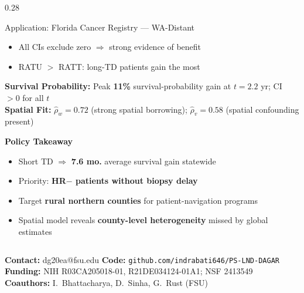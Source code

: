\documentclass[final]{beamer}
\begin{document}
\begin{frame}[fragile]
\begin{columns}[T]
\begin{column}{0.28\textwidth}
\begin{appblock}{Application: Florida Cancer Registry --- WA-Distant}
\raggedright
\vspace{3pt}
\begin{itemize}
\item All CIs exclude zero $\Rightarrow$ strong evidence of benefit
\item RATU $>$ RATT: long-TD patients gain the most
\end{itemize}

\vspace{3pt}
\begin{findingbox}
{\color{accentgreen!80!black}\textbf{Survival Probability:}} Peak \textbf{11\%} survival-probability gain at $t\!=\!2.2$ yr; CI $> 0$ for all $t$\\[2pt]
{\color{accentgreen!80!black}\textbf{Spatial Fit:}} $\hat{\rho}_w = 0.72$ (strong spatial borrowing); $\hat{\rho}_v = 0.58$ (spatial confounding present)
\end{findingbox}

\vspace{3pt}
\begin{keybox}
\centering
{\large\textbf{Policy Takeaway}}\\[2pt]
\begin{itemize}[itemsep=3pt]
\item Short TD $\Rightarrow$ \textbf{7.6 mo.} average survival gain statewide
\item Priority: \textbf{HR$-$ patients without biopsy delay}
\item Target \textbf{rural northern counties} for patient-navigation programs
\item Spatial model reveals \textbf{county-level heterogeneity} missed by global estimates
\end{itemize}
\end{keybox}

\end{appblock}

\end{column}

\end{columns}

\vspace{3pt}
\begin{tcolorbox}[
  colback=FSUgarnet, colframe=FSUgarnet, arc=0mm, boxrule=0pt,
  left=30pt, right=30pt, top=4pt, bottom=4pt
]
{\color{white}\small
\textbf{Contact:} dg20ea@fsu.edu
\hfill
\textbf{Code:} \texttt{github.com/indrabati646/PS-LND-DAGAR}
\hfill
\textbf{Funding:} NIH R03CA205018-01, R21DE034124-01A1; NSF 2413549
\hfill
\textbf{Coauthors:} I.\ Bhattacharya, D.\ Sinha, G.\ Rust (FSU)
}
\end{tcolorbox}

\end{frame}
\end{document}
